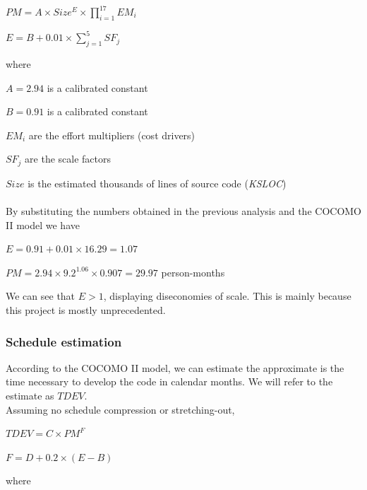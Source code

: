 \documentclass[english]{article}
\begin{document}
\begin{center}
$ PM = A \times Size^E \times \prod_{i=1}^{17} EM_i $
\end{center}

\begin{center}
$ E = B + 0.01 \times \sum_{j=1}^{5} SF_j $
\end{center}
where

$ A = 2.94 $ is a calibrated constant 

$ B = 0.91 $ is a calibrated constant

$EM_i$ are the effort multipliers (cost drivers)

$SF_j$ are the scale factors

$Size$ is the estimated thousands of lines of source code (\textit{KSLOC})


\paragraph{}
By substituting the numbers obtained in the previous analysis and the COCOMO II model we have

\begin{center}
$E = 0.91 + 0.01 \times 16.29 = 1.07$
\end{center}

\begin{center}
$PM = 2.94 \times 9.2^{1.06} \times 0.907 = 29.97$ person-months
\end{center}

We can see that $E > 1$, displaying diseconomies of scale. This is mainly because this project is mostly unprecedented.

\subsubsection{Schedule estimation}

According to the COCOMO II model, we can estimate the approximate is the time necessary to develop the code in calendar months. We will refer to the estimate as $TDEV$.\\
Assuming no schedule compression or stretching-out,

\begin{center}
	$TDEV = C \times PM^F$
\end{center}

\begin{center}
	$F = D + 0.2 \times (E-B)$
\end{center}
where
\end{document}
